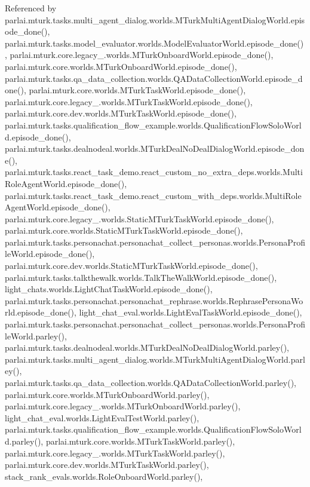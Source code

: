 Referenced by parlai.\+mturk.\+tasks.\+multi\+\_\+agent\+\_\+dialog.\+worlds.\+M\+Turk\+Multi\+Agent\+Dialog\+World.\+episode\+\_\+done(), parlai.\+mturk.\+tasks.\+model\+\_\+evaluator.\+worlds.\+Model\+Evaluator\+World.\+episode\+\_\+done(), parlai.\+mturk.\+core.\+legacy\+\_.\+worlds.\+M\+Turk\+Onboard\+World.\+episode\+\_\+done(), parlai.\+mturk.\+core.\+worlds.\+M\+Turk\+Onboard\+World.\+episode\+\_\+done(), parlai.\+mturk.\+tasks.\+qa\+\_\+data\+\_\+collection.\+worlds.\+Q\+A\+Data\+Collection\+World.\+episode\+\_\+done(), parlai.\+mturk.\+core.\+worlds.\+M\+Turk\+Task\+World.\+episode\+\_\+done(), parlai.\+mturk.\+core.\+legacy\+\_.\+worlds.\+M\+Turk\+Task\+World.\+episode\+\_\+done(), parlai.\+mturk.\+core.\+dev.\+worlds.\+M\+Turk\+Task\+World.\+episode\+\_\+done(), parlai.\+mturk.\+tasks.\+qualification\+\_\+flow\+\_\+example.\+worlds.\+Qualification\+Flow\+Solo\+World.\+episode\+\_\+done(), parlai.\+mturk.\+tasks.\+dealnodeal.\+worlds.\+M\+Turk\+Deal\+No\+Deal\+Dialog\+World.\+episode\+\_\+done(), parlai.\+mturk.\+tasks.\+react\+\_\+task\+\_\+demo.\+react\+\_\+custom\+\_\+no\+\_\+extra\+\_\+deps.\+worlds.\+Multi\+Role\+Agent\+World.\+episode\+\_\+done(), parlai.\+mturk.\+tasks.\+react\+\_\+task\+\_\+demo.\+react\+\_\+custom\+\_\+with\+\_\+deps.\+worlds.\+Multi\+Role\+Agent\+World.\+episode\+\_\+done(), parlai.\+mturk.\+core.\+legacy\+\_.\+worlds.\+Static\+M\+Turk\+Task\+World.\+episode\+\_\+done(), parlai.\+mturk.\+core.\+worlds.\+Static\+M\+Turk\+Task\+World.\+episode\+\_\+done(), parlai.\+mturk.\+tasks.\+personachat.\+personachat\+\_\+collect\+\_\+personas.\+worlds.\+Persona\+Profile\+World.\+episode\+\_\+done(), parlai.\+mturk.\+core.\+dev.\+worlds.\+Static\+M\+Turk\+Task\+World.\+episode\+\_\+done(), parlai.\+mturk.\+tasks.\+talkthewalk.\+worlds.\+Talk\+The\+Walk\+World.\+episode\+\_\+done(), light\+\_\+chats.\+worlds.\+Light\+Chat\+Task\+World.\+episode\+\_\+done(), parlai.\+mturk.\+tasks.\+personachat.\+personachat\+\_\+rephrase.\+worlds.\+Rephrase\+Persona\+World.\+episode\+\_\+done(), light\+\_\+chat\+\_\+eval.\+worlds.\+Light\+Eval\+Task\+World.\+episode\+\_\+done(), parlai.\+mturk.\+tasks.\+personachat.\+personachat\+\_\+collect\+\_\+personas.\+worlds.\+Persona\+Profile\+World.\+parley(), parlai.\+mturk.\+tasks.\+dealnodeal.\+worlds.\+M\+Turk\+Deal\+No\+Deal\+Dialog\+World.\+parley(), parlai.\+mturk.\+tasks.\+multi\+\_\+agent\+\_\+dialog.\+worlds.\+M\+Turk\+Multi\+Agent\+Dialog\+World.\+parley(), parlai.\+mturk.\+tasks.\+qa\+\_\+data\+\_\+collection.\+worlds.\+Q\+A\+Data\+Collection\+World.\+parley(), parlai.\+mturk.\+core.\+worlds.\+M\+Turk\+Onboard\+World.\+parley(), parlai.\+mturk.\+core.\+legacy\+\_.\+worlds.\+M\+Turk\+Onboard\+World.\+parley(), light\+\_\+chat\+\_\+eval.\+worlds.\+Light\+Eval\+Test\+World.\+parley(), parlai.\+mturk.\+tasks.\+qualification\+\_\+flow\+\_\+example.\+worlds.\+Qualification\+Flow\+Solo\+World.\+parley(), parlai.\+mturk.\+core.\+worlds.\+M\+Turk\+Task\+World.\+parley(), parlai.\+mturk.\+core.\+legacy\+\_.\+worlds.\+M\+Turk\+Task\+World.\+parley(), parlai.\+mturk.\+core.\+dev.\+worlds.\+M\+Turk\+Task\+World.\+parley(), stack\+\_\+rank\+\_\+evals.\+worlds.\+Role\+Onboard\+World.\+parley(), 